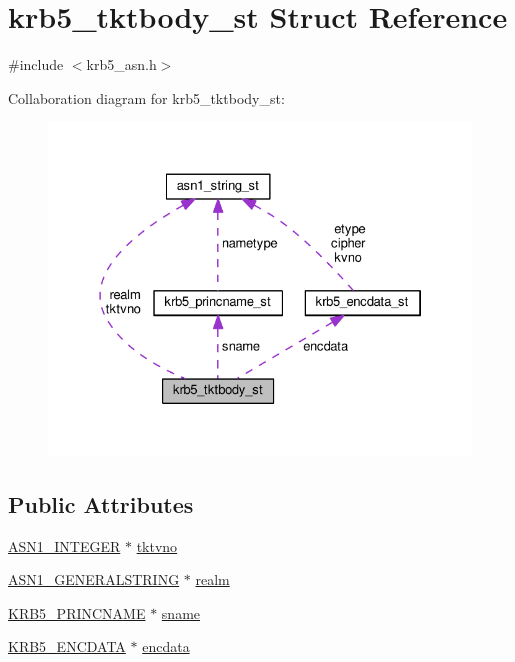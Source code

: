 \hypertarget{structkrb5__tktbody__st}{}\section{krb5\+\_\+tktbody\+\_\+st Struct Reference}
\label{structkrb5__tktbody__st}


{\ttfamily \#include $<$krb5\+\_\+asn.\+h$>$}



Collaboration diagram for krb5\+\_\+tktbody\+\_\+st\+:
\nopagebreak
\begin{figure}[H]
\begin{center}
\leavevmode
\includegraphics[width=328pt]{structkrb5__tktbody__st__coll__graph}
\end{center}
\end{figure}
\subsection*{Public Attributes}
\begin{DoxyCompactItemize}
\item 
\hyperlink{ossl__typ_8h_af4335399bf9774cb410a5e93de65998b}{A\+S\+N1\+\_\+\+I\+N\+T\+E\+G\+ER} $\ast$ \hyperlink{structkrb5__tktbody__st_ab08375dff74a8c2325a6f513a57db966}{tktvno}
\item 
\hyperlink{ossl__typ_8h_a7357d22f3b42ad606a72aad7f1668dd3}{A\+S\+N1\+\_\+\+G\+E\+N\+E\+R\+A\+L\+S\+T\+R\+I\+NG} $\ast$ \hyperlink{structkrb5__tktbody__st_afda45dfe18a1811139bec0b5ef92f279}{realm}
\item 
\hyperlink{krb5__asn_8h_aaf05b59cc572d53060ef9a86133e10e1}{K\+R\+B5\+\_\+\+P\+R\+I\+N\+C\+N\+A\+ME} $\ast$ \hyperlink{structkrb5__tktbody__st_a2348d5ac085e82390778933a463d9333}{sname}
\item 
\hyperlink{krb5__asn_8h_abd8389e6748e062079450c000e20a856}{K\+R\+B5\+\_\+\+E\+N\+C\+D\+A\+TA} $\ast$ \hyperlink{structkrb5__tktbody__st_af8a772eee7b3423d1d48926ca5dfea20}{encdata}
\end{DoxyCompactItemize}


